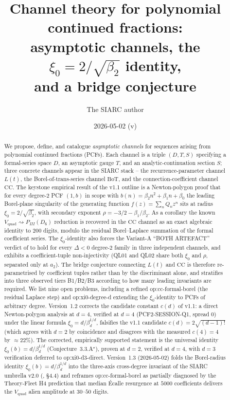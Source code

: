 \documentclass[11pt,reqno]{amsart}
\title[Channel theory for polynomial continued fractions]
{Channel theory for polynomial continued fractions:\\
asymptotic channels,
the $\xi_0 = 2/\sqrt{\beta_2}$ identity,\\
and a bridge conjecture}
\author{The SIARC author}
\date{2026-05-02 (v\version)}
\theoremstyle{plain}
\theoremstyle{definition}
\theoremstyle{remark}
\newcommand{\Lt}{L(t)}
\newcommand{\BoT}{\mathrm{BoT}}
\newcommand{\CC}{\mathrm{CC}}
\newcommand{\Vquad}{V_{\mathrm{quad}}}
\begin{document}
\maketitle

\begin{abstract}
We propose, define, and catalogue \emph{asymptotic channels}
for sequences arising from polynomial continued fractions
(PCFs). Each channel is a triple $(D, T, S)$ specifying a
formal-series space $D$, an asymptotic gauge $T$, and an
analytic-continuation section $S$; three concrete channels
appear in the SIARC stack -- the recurrence-parameter channel
$\Lt$, the Borel-of-trans-series channel $\BoT$, and the
connection-coefficient channel $\CC$. The keystone empirical
result of the v1.1 outline is a Newton-polygon proof
\cite{siarc_cc_pipeline_g} that for every degree-$2$ PCF
$(1, b)$ in scope with $b(n) = \beta_2 n^2 + \beta_1 n + \beta_0$
the leading Borel-plane singularity of the generating function
$f(z) = \sum_n Q_n z^n$ sits at radius
$\xi_0 = 2/\sqrt{\beta_2}$, with secondary exponent
$\rho = -3/2 - \beta_1/\beta_2$. As a corollary the known
$\Vquad \rightsquigarrow P_{III}(D_6)$ reduction is recovered
in the $\CC$ channel as an exact algebraic identity to
$200$ digits, modulo the residual Borel--Laplace summation of
the formal coefficient series. The $\xi_0$-identity also
forces the Variant-A ``BOTH ARTEFACT'' verdict of
\cite{siarc_borel_kscan} to hold for every $\Delta<0$
degree-$2$ family in three independent channels, and
exhibits a coefficient-tuple non-injectivity (QL01 and QL02
share both $\xi_0$ and $\rho$, separated only at $a_2$). The
bridge conjecture connecting $\Lt$ and $\CC$ is therefore
re-parametrised by coefficient tuples rather than by the
discriminant alone, and stratifies into three observed tiers
B1/B2/B3 according to how many leading invariants are required.
We list nine open problems, including a refined
\textsf{op:cc-formal-borel} (the residual Laplace step) and
\textsf{op:xi0-degree-d} extending the $\xi_0$-identity to
PCFs of arbitrary degree. Version~1.2 corrects the candidate
constant $c(d)$ of v1.1: a direct Newton-polygon analysis at
$d=4$, verified at $d=4$ (PCF2-SESSION-Q1, spread $0$) under
the linear formula $\xi_0 = d/\beta_d^{1/d}$, falsifies the
v1.1 candidate $c(d) = 2\sqrt{(d-1)!}$ (which agrees with
$d=2$ by coincidence and disagrees with the measured $c(4)=4$
by $\approx 22\%$). The corrected, empirically supported
statement is the universal identity
$\xi_0(b) = d/\beta_d^{1/d}$
(Conjecture~3.3.A$^{\star}$), proven at $d=2$, verified at
$d=4$, with $d=3$ verification deferred to
\textsf{op:xi0-d3-direct}.
Version~1.3 (2026-05-02) folds the Borel-radius identity
$\xi_0(b) = d/\beta_d^{1/d}$ into the three-axis cross-degree
invariant of the SIARC umbrella v2.0
(\cite{siarc_umbrella_v2}, \S4.4) and reframes
\textsf{op:cc-formal-borel} as partially diagnosed by the
Theory-Fleet H4 prediction \cite{siarc_theory_fleet_h4} that
median \'Ecalle resurgence at $5000$ coefficients delivers the
$V_{\mathrm{quad}}$ alien amplitude at $30$--$50$ digits.
\end{abstract}
\end{document}
